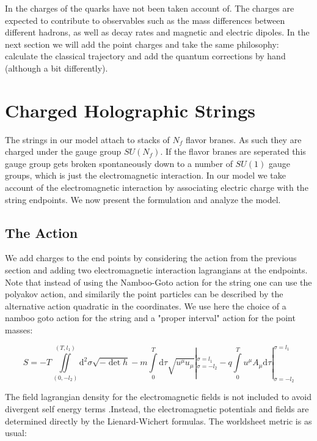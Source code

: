 \documentclass[11pt,a4paper]{article}
\begin{document}
In \cite{Sonnenschein14} the charges of the quarks have not been taken account of. The charges are expected to contribute to observables such as the mass differences between different hadrons, as well as decay rates and magnetic and electric dipoles. In the next section we will add the point charges and take the same philosophy: calculate the classical trajectory and add the quantum corrections by hand (although a bit differently).

\FloatBarrier
\section{Charged Holographic Strings}

The strings in our model attach to stacks of $N_f$ flavor branes. As such they are charged under the gauge group $SU(N_f)$. If the flavor branes are seperated this gauge group gets broken spontaneously down to a number of $SU(1)$ gauge groups, which is just the electromagnetic interaction. In our model we take account of the electromagnetic interaction by associating electric charge with the string endpoints. We now present the formulation and analyze the model.

\FloatBarrier
\subsection{The Action}

We add charges to the end points by considering the action from the previous section and adding two electromagnetic interaction lagrangians at the endpoints. Note that instead of using the Namboo-Goto action for the string one can use the polyakov action, and similarily the point particles can be described by the alternative action quadratic in the coordinates. We use here the choice of a namboo goto action for the string and a "proper interval" action for the point masses:

\begin{equation}
S=-T\iint\limits_{(0,-l_{2})}^{(T,l_{1})}\mathrm{d}^{2}\sigma\sqrt{-\det h}-m\int\limits_{0}^{T}\mathrm{d}\tau\sqrt{u^{\mu}u_{\mu}}|_{\sigma=-l_{2}}^{\sigma=l_{1}}-q\int\limits_{0}^{T}u^{\mu}A_{\mu}\mathrm{d}\tau|_{\sigma=-l_{2}}^{\sigma=l_{1}}
\end{equation}

The field lagrangian density for the electromagnetic fields is not included to avoid divergent self energy terms .Instead, the electromagnetic potentials and fields are determined directly by the Lienard-Wichert formulas. The worldsheet metric is as usual:
\end{document}
